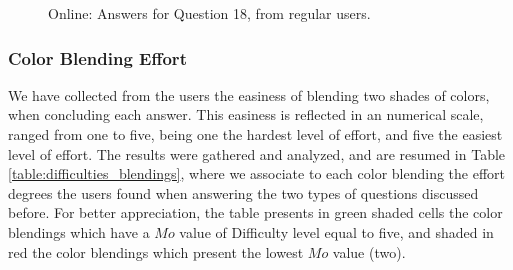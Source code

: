 \begin{figure}[!htbp]
\begin{minipage}{0.48\textwidth}
    \caption[Online: Answers for Question 18, from regular users.]{Online: Answers for Question 18, from regular users.}
    \label{fig:yellowblend_2}
  \end{minipage}
\end{figure}
%
\subsubsection{Color Blending Effort}
\label{subsubsec:difficulty_rating}
%
We have collected from the users the easiness of blending two shades of colors, when concluding each answer. This easiness is reflected in an numerical scale, ranged from one to five, being one the hardest level of effort, and five the easiest level
of effort. The results were gathered and analyzed, and are resumed in Table \ref{table:difficulties_blendings}, where we associate to each color blending the effort degrees the users found when answering the two types of questions discussed before.
For better appreciation, the table presents in green shaded cells the color blendings which have a $Mo$ value of Difficulty level equal to five, and shaded in red the color blendings which present the lowest $Mo$ value (two). \par
%
